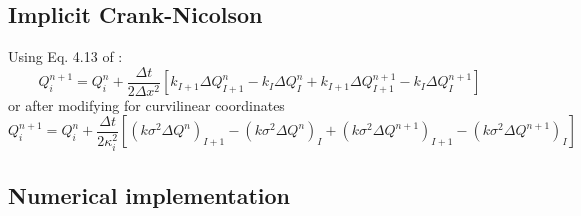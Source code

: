 \subsection{Implicit Crank-Nicolson}
Using Eq. 4.13 of \cite{LeVeque03}:
\begin{equation}\label{EqDiffCN_LV}
Q^{n+1}_i = Q^{n}_i + \frac{\Delta t}{2\Delta x^2} \left[ 
k_{I+1}\Delta Q^{n}_{I+1} - k_{I}\Delta Q^{n}_{I} +
k_{I+1}\Delta Q^{n+1}_{I+1} - k_{I}\Delta Q^{n+1}_{I} \right]
\end{equation}
or after modifying for curvilinear coordinates
\begin{equation}\label{EqDiffCN_LV}
Q^{n+1}_i = Q^{n}_i + \frac{\Delta t}{2\kappa_i^2} \left[ 
\left( k \sigma^2 \Delta Q^{n}  \right)_{I+1} - \left( k \sigma^2 \Delta Q^{n}  \right)_{I} +
\left( k \sigma^2 \Delta Q^{n+1}\right)_{I+1} - \left( k \sigma^2 \Delta Q^{n+1}\right)_{I} \right]
\end{equation}

\subsection{Numerical implementation}
